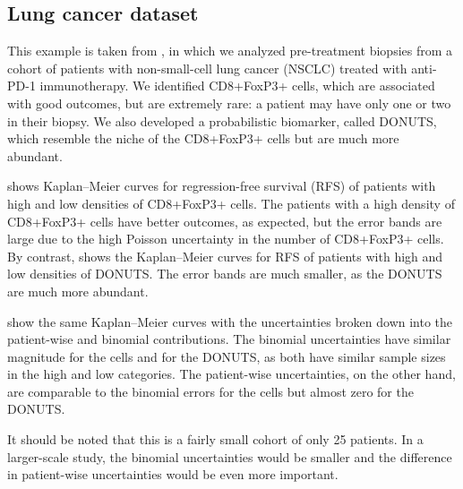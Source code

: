 \documentclass[article]{jss}
\newcommand{\KM}{Kaplan--Meier} %
\begin{document}
\subsection{Lung cancer dataset}

This example is taken from \citet{AstroPathLung}, in which we analyzed pre-treatment biopsies from a cohort of patients with non-small-cell lung cancer (NSCLC) treated with anti-PD-1 immunotherapy.  We identified CD8+FoxP3+ cells, which are associated with good outcomes, but are extremely rare: a patient may have only one or two in their biopsy.  We also developed a probabilistic biomarker, called DONUTS, which resemble the niche of the CD8+FoxP3+ cells but are much more abundant.

 shows \KM{} curves for regression-free survival (RFS) of patients with high and low densities of CD8+FoxP3+ cells.  The patients with a high density of CD8+FoxP3+ cells have better outcomes, as expected, but the error bands are large due to the high Poisson uncertainty in the number of CD8+FoxP3+ cells.  By contrast,  shows the \KM{} curves for RFS of patients with high and low densities of DONUTS\@.  The error bands are much smaller, as the DONUTS are much more abundant.

 show the same \KM{} curves with the uncertainties broken down into the patient-wise and binomial contributions.  The binomial uncertainties have similar magnitude for the cells and for the DONUTS, as both have similar sample sizes in the high and low categories.  The patient-wise uncertainties, on the other hand, are comparable to the binomial errors for the cells but almost zero for the DONUTS\@.

It should be noted that this is a fairly small cohort of only 25 patients.  In a larger-scale study, the binomial uncertainties would be smaller and the difference in patient-wise uncertainties would be even more important.
\end{document}

